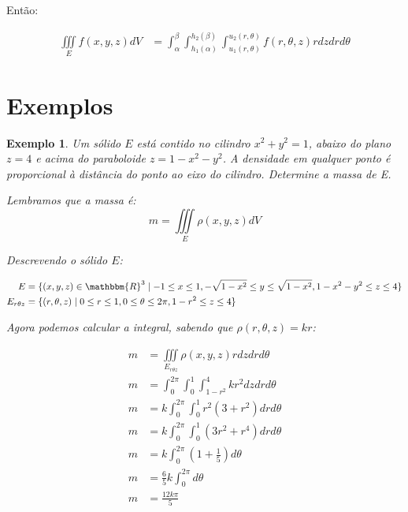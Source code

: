 \documentclass{article}
\newcommand{\REAL}{\mathbbm{R}}
\newcommand{\tripleint}[2] {\iiint\limits_{#1} #2}
\newtheorem{example}{Exemplo}[section]
\begin{document}
            Então:

            \begin{align*}
                \tripleint{E}{f(x,y,z) dV} &= \int_\alpha^\beta \int_{h_1(\alpha)}^{h_2(\beta)} \int_{u_1(r,\theta)}^{u_2(r,\theta)} f(r, \theta, z) r dz dr d\theta
            \end{align*}

    \section{Exemplos}
        \begin{example}
            Um sólido $E$ está contido no cilindro $x^2 + y^2 = 1$, abaixo do plano $z = 4$ e acima do paraboloide
            $z = 1 - x^2 - y^2$. A densidade em qualquer ponto é proporcional à distância do ponto ao eixo do cilindro. Determine
            a massa de E.

            Lembramos que a massa é:
            \[
                m = \tripleint{E}{\rho(x,y,z) dV}
            \]

            Descrevendo o sólido $E$:

            \begin{align*}
                E &= \{ (x,y,z) \in \REAL^3 \mid -1 \leq x \leq 1, -\sqrt{1 - x^2} \leq y \leq \sqrt{1 - x^2}, 1 - x^2 - y^2 \leq z \leq 4\}\\
                E_{r\theta z} &= \{ (r, \theta, z) \mid 0 \leq r \leq 1, 0 \leq \theta \leq 2\pi, 1 - r^2 \leq z \leq 4 \}
            \end{align*}

            Agora podemos calcular a integral, sabendo que $\rho(r, \theta, z) = kr$:

            \begin{align*}
                m &= \tripleint{E_{r\theta z}}{\rho(x,y,z) r dz dr d\theta}\\
                m &= \int_0^{2\pi} \int_0^1 \int_{1 - r^2}^{4} kr^2 dz dr d\theta\\
                m &= k \int_0^{2\pi} \int_0^1 r^2 (3 + r^2) dr d\theta\\
                m &= k \int_0^{2\pi} \int_0^1 (3r^2 + r^4) dr d\theta\\
                m &= k \int_0^{2\pi} \left(1 + \frac{1}{5}\right) d\theta\\
                m &= \frac{6}{5}k \int_0^{2\pi} d\theta\\
                m &= \frac{12 k\pi}{5}
            \end{align*}
        \end{example}
\end{document}
